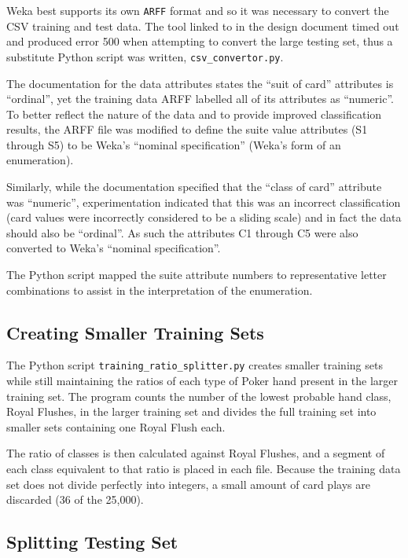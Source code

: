 \documentclass[10pt, a4paper]{article}
\begin{document}
Weka best supports its own \texttt{ARFF} format and so it was necessary to convert the CSV training \cite{trainingdata} and test \cite{testdata} data. The tool linked to in the design document \cite{arffconv} timed out and produced error 500 when attempting to convert the large testing set, thus a substitute Python script was written, \texttt{csv\_convertor.py}.

The documentation for the data attributes \cite{expattr} states the ``suit of card'' attributes is ``ordinal'', yet the training data ARFF labelled all of its attributes as ``numeric''. To better reflect the nature of the data and to provide improved classification results, the ARFF file was modified to define the suite value attributes (S1 through S5) to be Weka's ``nominal specification'' (Weka's form of an enumeration).

Similarly, while the documentation specified that the ``class of card'' attribute was ``numeric'', experimentation indicated that this was an incorrect classification (card values were incorrectly considered to be a sliding scale) and in fact the data should also be ``ordinal''. As such the attributes C1 through C5 were also converted to Weka's ``nominal specification''.

The Python script mapped the suite attribute numbers to representative letter combinations to assist in the interpretation of the enumeration.

\subsection*{Creating Smaller Training Sets}

The Python script \texttt{training\_ratio\_splitter.py} creates smaller training sets while still maintaining the ratios of each type of Poker hand present in the larger training set. The program counts the number of the lowest probable hand class, Royal Flushes,  in the larger training set and divides the full training set into smaller sets containing one Royal Flush each.

The ratio of classes is then calculated against Royal Flushes, and a segment of each class equivalent to that ratio is placed in each file. Because the training data set does not divide perfectly into integers, a small amount of card plays are discarded (36 of the 25,000). 

\subsection*{Splitting Testing Set}
\end{document}
